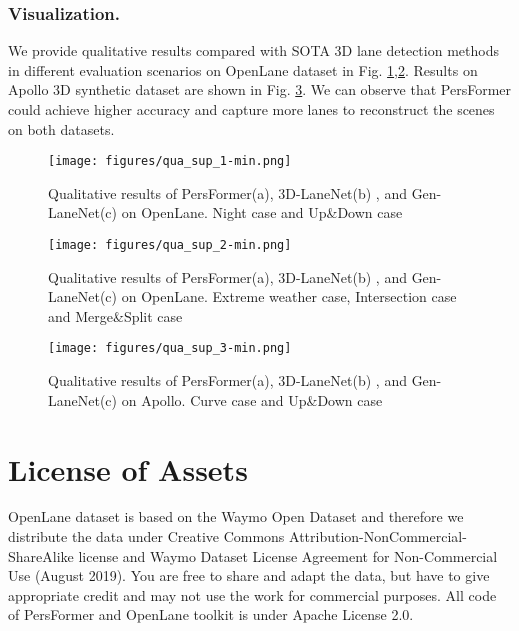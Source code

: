 \documentclass[runningheads]{llncs}
\begin{document}
\subsubsection{Visualization.}
We provide qualitative results compared with SOTA 3D lane detection methods in different evaluation scenarios on OpenLane dataset in Fig. \ref{fig:qualitative-1},\ref{fig:qualitative-2}.
Results on Apollo 3D synthetic dataset are shown in Fig. \ref{fig:qualitative-apollo}.
We can observe that PersFormer could achieve higher accuracy and capture more lanes to reconstruct the scenes on both datasets.

\begin{figure}[tb!]
    \centering
    \texttt{[image: figures/qua\_sup\_1-min.png]}
    \caption{Qualitative results of PersFormer(a), 3D-LaneNet(b) \cite{Garnett_2019_ICCV}, and Gen-LaneNet(c) \cite{guo2020gen} on OpenLane. Night case and Up\&Down case}
    \label{fig:qualitative-1}
\end{figure}

\begin{figure}[tb!]
    \centering
    \texttt{[image: figures/qua\_sup\_2-min.png]}
    \caption{Qualitative results of PersFormer(a), 3D-LaneNet(b) \cite{Garnett_2019_ICCV}, and Gen-LaneNet(c) \cite{guo2020gen} on OpenLane. Extreme weather case, Intersection case and Merge\&Split case}
    \label{fig:qualitative-2}
\end{figure}

\begin{figure}[tb!]
    \centering
    \texttt{[image: figures/qua\_sup\_3-min.png]}
    \caption{Qualitative results of PersFormer(a), 3D-LaneNet(b) \cite{Garnett_2019_ICCV}, and Gen-LaneNet(c) \cite{guo2020gen} on Apollo. Curve case and Up\&Down case}
    \label{fig:qualitative-apollo}
\end{figure}



\section{License of Assets}
OpenLane dataset is based on the Waymo Open Dataset \cite{sun2020scalability} and therefore we distribute the data under Creative Commons Attribution-NonCommercial-ShareAlike license and Waymo Dataset License Agreement for Non-Commercial Use (August 2019). You are free to share and adapt the data, but have to give appropriate credit and may not use the work for commercial purposes. All code of PersFormer and OpenLane toolkit is under Apache License 2.0.
\end{document}
